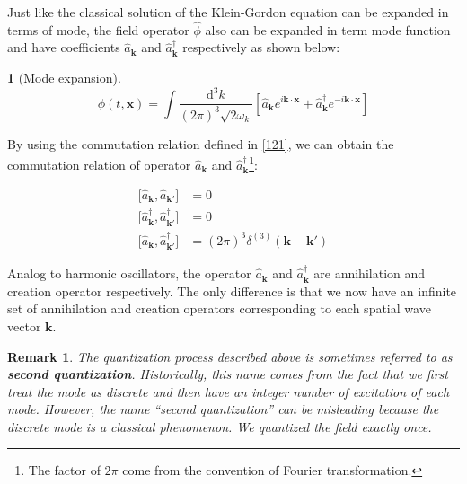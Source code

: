 \documentclass[12pt]{article}
\numberwithin{equation}{section}
\theoremstyle{1style}
\newtheorem{cthm}[equation]{}
\newtheorem*{remark}{Remark}
\newcommand{\tbf}[1]{\textbf{#1}}
\newcommand{\id}{\mathrm{d}}
\begin{document}
Just like the classical solution of the Klein-Gordon equation can be expanded in terms of mode,
the field operator \(\hat{\phi}\) also can be expanded in term mode function and have coefficients \(\hat{a}_{\mathbf{k}}\) and
\(\hat{a}^{\dagger}_{\mathbf{k}}\) respectively as shown below:
\begin{cthm}[Mode expansion]\label{ME}
  \[\phi(t,\mathbf{x})=\int\frac{\id^{3}k}{(2\pi)^3\sqrt{2\omega_{k}}}\left[\hat{a}_{\mathbf{k}}e^{i\mathbf{k}\cdot \mathbf{x}}+
    \hat{a}^{\dagger}_{\mathbf{k}}e^{-i\mathbf{k}\cdot \mathbf{x}}\right]\]
\end{cthm}
By using the commutation relation defined in \ref{121}, we can obtain the commutation relation of operator \(\hat{a}_{\mathbf{k}}\) and
\(\hat{a}^{\dagger}_{\mathbf{k}}\)\footnote{The factor of \(2\pi\) come from the convention of Fourier transformation.}:

\begin{align}
  \bigl[\hat{a}_{\mathbf{k}},\hat{a}_{\mathbf{k'}}\bigr]                     & =0                                            \\
  \bigl[\hat{a}^{\dagger}_{\mathbf{k}},\hat{a}^{\dagger}_{\mathbf{k'}}\bigr] & =0                                            \\
  \bigl[\hat{a}_{\mathbf{k}},\hat{a}^{\dagger}_{\mathbf{k'}}\bigr]           & =(2\pi)^3\delta^{(3)}(\mathbf{k}-\mathbf{k'})
\end{align}



Analog to harmonic oscillators, the operator \(\hat{a}_{\mathbf{k}}\) and
\(\hat{a}^{\dagger}_{\mathbf{k}}\) are annihilation and creation operator respectively.
The only difference is that we now have an infinite set of annihilation and creation operators corresponding to each spatial wave vector \(\mathbf{k}\).

\begin{remark}
  The quantization process described above is sometimes referred to as \tbf{second quantization}. Historically, this name
  comes from the fact that we first treat the mode as discrete and then have an integer number of excitation of each mode.
  However, the name ``second quantization'' can be misleading because the discrete mode is a classical phenomenon.
  We quantized the field exactly once.
\end{remark}
\end{document}
